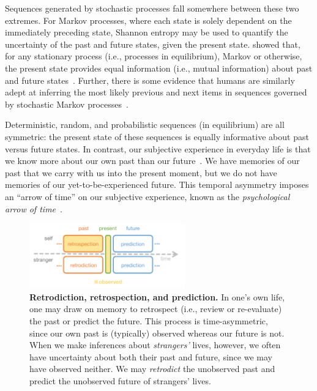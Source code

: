\documentclass[10pt]{article}
\begin{document}
Sequences generated by stochastic processes fall somewhere between these two extremes. For Markov processes, where each state is solely dependent on the immediately preceding state, Shannon entropy may be used to quantify the uncertainty of the past and future states, given the present state. \cite{Cove94} showed that, for any stationary process (i.e., processes in equilibrium), Markov or otherwise, the present state provides equal information (i.e., mutual information) about past and future states~\citep[also see][]{BialEtal01, ElliEtal09}. Further, there is some evidence that humans are similarly adept at inferring the most likely previous and next items in sequences governed by stochastic Markov processes~\citep{JonePash07}.

Deterministic, random, and probabilistic sequences (in equilibrium) are all symmetric: the present state of these sequences is equally informative about past versus future states. In contrast, our subjective experience in everyday life is that we know more about our own past than our future~\citep[e.g.,][]{Horw87}. We have memories of our past that we carry with us into the present moment, but we do not have memories of our yet-to-be-experienced future. This temporal asymmetry imposes an ``arrow of time'' on our subjective experience, known as the \textit{psychological arrow of time}~\citep[e.g.,][]{Hawk85}.

\begin{figure}[tp]
  \centering
  \includegraphics[width=0.6\textwidth]{intro}

  \caption{\textbf{Retrodiction, retrospection, and prediction.} In one's own life, one may draw on memory to retrospect (i.e., review or re-evaluate) the past or predict the future. This process is time-asymmetric, since our own past is (typically) observed whereas our future is not. When we make inferences about \textit{strangers'} lives, however, we often have uncertainty about both their past and future, since we may have observed neither. We may \textit{retrodict} the unobserved past and predict the unobserved future of strangers' lives.}

  \label{fig:intro}
\end{figure}
\end{document}
